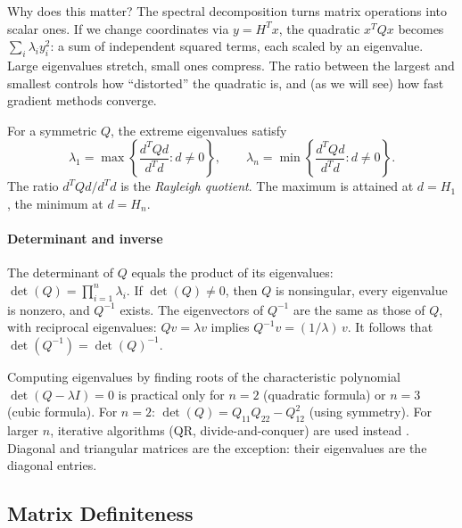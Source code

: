 Why does this matter?
The spectral decomposition turns matrix operations into scalar ones.
If we change coordinates via $y = H^T x$, the quadratic $x^T Q x$ becomes $\sum_i \lambda_i y_i^2$: a sum of independent squared terms, each scaled by an eigenvalue.
Large eigenvalues stretch, small ones compress.
The ratio between the largest and smallest controls how ``distorted'' the quadratic is, and (as we will see) how fast gradient methods converge.

\begin{theorem}\label{thm:var-eigen}
	For a symmetric $Q$, the extreme eigenvalues satisfy
	\begin{equation}\label{eq:rayleigh-quotient}
		\lambda_1 = \max\left\{\frac{d^T Q d}{d^T d} : d \neq 0\right\},
		\qquad
		\lambda_n = \min\left\{\frac{d^T Q d}{d^T d} : d \neq 0\right\}.
	\end{equation}
	The ratio $d^T Q d / d^T d$ is the \textit{Rayleigh quotient}.
	The maximum is attained at $d = H_1$, the minimum at $d = H_n$.
\end{theorem}

\paragraph{Determinant and inverse}

\begin{definition}[Determinant]\label{def:determinant}
	The determinant of $Q$ equals the product of its eigenvalues:
	$\det(Q) = \prod_{i=1}^{n} \lambda_i$.
	If $\det(Q) \neq 0$, then $Q$ is nonsingular, every eigenvalue is nonzero, and $Q^{-1}$ exists.
	The eigenvectors of $Q^{-1}$ are the same as those of $Q$, with reciprocal eigenvalues: $Qv = \lambda v$ implies $Q^{-1}v = (1/\lambda)\, v$.
	It follows that $\det(Q^{-1}) = \det(Q)^{-1}$.
\end{definition}

Computing eigenvalues by finding roots of the characteristic polynomial $\det(Q - \lambda I) = 0$ is practical only for $n = 2$ (quadratic formula) or $n = 3$ (cubic formula).
For $n = 2$: $\det(Q) = Q_{11}Q_{22} - Q_{12}^2$ (using symmetry).
For larger $n$, iterative algorithms (QR, divide-and-conquer) are used instead \cite{nocedal2006}.
Diagonal and triangular matrices are the exception: their eigenvalues are the diagonal entries.


\subsection{Matrix Definiteness}\label{sec:definiteness}

